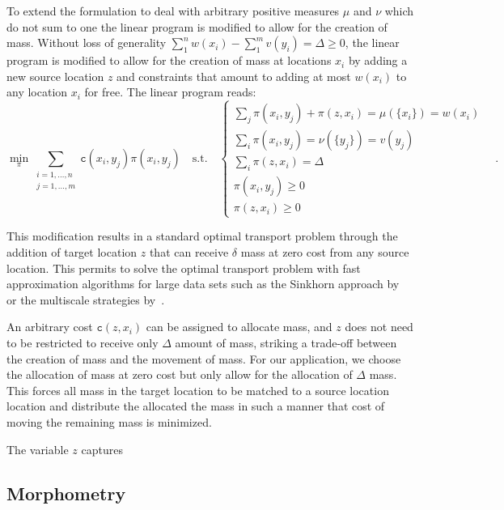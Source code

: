 \documentclass{llncs}
\newcommand{\cost}[0]{\mathtt{c}}
\newcommand{\coupling}[0]{\pi}
\begin{document}
To extend the formulation to deal with arbitrary positive measures $\mu$ and
$\nu$ which do not sum to one the linear program is modified to allow for the
creation of mass. Without loss of generality $\sum_1^n w(x_i)  - \sum_1^m
v(y_i) = \Delta \ge 0$, the linear program is modified to allow for the
creation of mass at locations $x_i$ by adding a new source location $z$ and
constraints that amount to adding at most $w(x_i)$ to any location $x_i$ for
free. The linear program reads: 
\begin{equation}
\min_\coupling \sum_{\substack{i=1,\dots,n\\ j=1,\dots,m}} 
      \cost(x_i, y_j) \coupling(x_i, y_j) \quad \text{s.t.}\quad 
\begin{cases}
  \sum_j \coupling(x_i, y_j) + \coupling(z, x_i) = \mu(\{x_i\}) = w(x_i) & \\ 
  \sum_i \coupling(x_i, y_j) = \nu(\{y_j\}) = v(y_j) & \\
  \sum_i \coupling(z, x_i)  = \Delta \\
  \coupling(x_i, y_j) \ge 0 \\
  \coupling(z, x_i) \ge 0
\end{cases}\,.
\label{e:LPformulation}
\end{equation} 

This modification results in a standard optimal transport problem through the
addition of target location $z$ that can receive $\delta$ mass at zero cost
from any source location.  This permits to solve the optimal transport problem
with fast approximation algorithms for large data sets such as the Sinkhorn
approach by~\cite{cutuiri:} or the multiscale strategies
by~\citet{gerber:jmlr17}. 

An arbitrary cost $\cost(z, x_i)$ can be assigned to allocate mass, and $z$
does not need to be restricted to receive only $\Delta$ amount of mass,
striking a trade-off between the creation of mass and the movement of mass. For
our application, we choose the allocation of mass at zero cost but only allow
for the allocation of $\Delta$ mass. This forces all mass in the target
location to be matched to a source location location and distribute the
allocated the mass in such a manner that cost of moving the remaining mass is
minimized.

The variable $z$ captures


\subsection{Morphometry}
\end{document}
